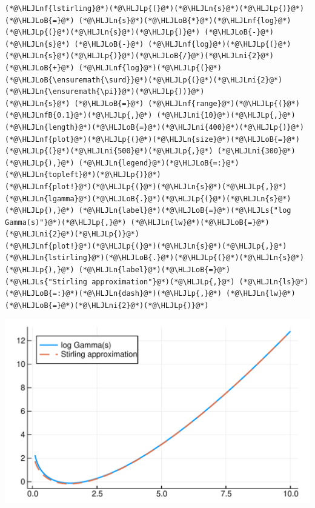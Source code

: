 \documentclass[12pt,a4paper,xelatex,ja=standard]{bxjsarticle}
\newcommand{\HLJLn}[1]{#1}
\newcommand{\HLJLnf}[1]{\textcolor[RGB]{66,102,213}{#1}}
\newcommand{\HLJLs}[1]{\textcolor[RGB]{201,61,57}{#1}}
\newcommand{\HLJLnfB}[1]{\textcolor[RGB]{59,151,46}{#1}}
\newcommand{\HLJLni}[1]{\textcolor[RGB]{59,151,46}{#1}}
\newcommand{\HLJLoB}[1]{\textcolor[RGB]{102,102,102}{\textbf{#1}}}
\newcommand{\HLJLp}[1]{#1}
\begin{document}
\begin{lstlisting}
(*@\HLJLnf{lstirling}@*)(*@\HLJLp{(}@*)(*@\HLJLn{s}@*)(*@\HLJLp{)}@*) (*@\HLJLoB{=}@*) (*@\HLJLn{s}@*)(*@\HLJLoB{*}@*)(*@\HLJLnf{log}@*)(*@\HLJLp{(}@*)(*@\HLJLn{s}@*)(*@\HLJLp{)}@*) (*@\HLJLoB{-}@*) (*@\HLJLn{s}@*) (*@\HLJLoB{-}@*) (*@\HLJLnf{log}@*)(*@\HLJLp{(}@*)(*@\HLJLn{s}@*)(*@\HLJLp{)}@*)(*@\HLJLoB{/}@*)(*@\HLJLni{2}@*) (*@\HLJLoB{+}@*) (*@\HLJLnf{log}@*)(*@\HLJLp{(}@*)(*@\HLJLoB{\ensuremath{\surd}}@*)(*@\HLJLp{(}@*)(*@\HLJLni{2}@*)(*@\HLJLn{\ensuremath{\pi}}@*)(*@\HLJLp{))}@*)
(*@\HLJLn{s}@*) (*@\HLJLoB{=}@*) (*@\HLJLnf{range}@*)(*@\HLJLp{(}@*)(*@\HLJLnfB{0.1}@*)(*@\HLJLp{,}@*) (*@\HLJLni{10}@*)(*@\HLJLp{,}@*) (*@\HLJLn{length}@*)(*@\HLJLoB{=}@*)(*@\HLJLni{400}@*)(*@\HLJLp{)}@*)
(*@\HLJLnf{plot}@*)(*@\HLJLp{(}@*)(*@\HLJLn{size}@*)(*@\HLJLoB{=}@*)(*@\HLJLp{(}@*)(*@\HLJLni{500}@*)(*@\HLJLp{,}@*) (*@\HLJLni{300}@*)(*@\HLJLp{),}@*) (*@\HLJLn{legend}@*)(*@\HLJLoB{=:}@*)(*@\HLJLn{topleft}@*)(*@\HLJLp{)}@*)
(*@\HLJLnf{plot!}@*)(*@\HLJLp{(}@*)(*@\HLJLn{s}@*)(*@\HLJLp{,}@*) (*@\HLJLn{lgamma}@*)(*@\HLJLoB{.}@*)(*@\HLJLp{(}@*)(*@\HLJLn{s}@*)(*@\HLJLp{),}@*) (*@\HLJLn{label}@*)(*@\HLJLoB{=}@*)(*@\HLJLs{"log Gamma(s)"}@*)(*@\HLJLp{,}@*) (*@\HLJLn{lw}@*)(*@\HLJLoB{=}@*)(*@\HLJLni{2}@*)(*@\HLJLp{)}@*)
(*@\HLJLnf{plot!}@*)(*@\HLJLp{(}@*)(*@\HLJLn{s}@*)(*@\HLJLp{,}@*) (*@\HLJLn{lstirling}@*)(*@\HLJLoB{.}@*)(*@\HLJLp{(}@*)(*@\HLJLn{s}@*)(*@\HLJLp{),}@*) (*@\HLJLn{label}@*)(*@\HLJLoB{=}@*)(*@\HLJLs{"Stirling approximation"}@*)(*@\HLJLp{,}@*) (*@\HLJLn{ls}@*)(*@\HLJLoB{=:}@*)(*@\HLJLn{dash}@*)(*@\HLJLp{,}@*) (*@\HLJLn{lw}@*)(*@\HLJLoB{=}@*)(*@\HLJLni{2}@*)(*@\HLJLp{)}@*)
\end{lstlisting}


\begin{center}
\includegraphics[width=0.8\linewidth]{figures/テスト_2_1.pdf}
\end{center}
\end{document}
